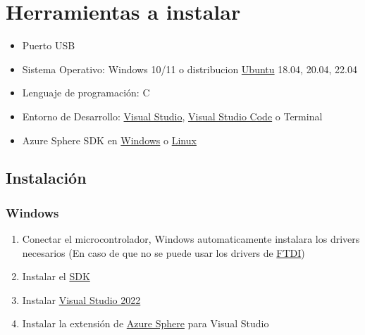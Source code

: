 \section{Herramientas a instalar}

\begin{itemize}
	\item 
	Puerto USB
	\item
	Sistema Operativo: Windows 10/11 o 
	distribucion \href{https://ubuntu.com/}{Ubuntu} 18.04, 20.04, 22.04
	\item 
	Lenguaje de programación: C
	\item 
	Entorno de Desarrollo: \href{https://visualstudio.microsoft.com/es/}{Visual Studio}, 
	\href{https://code.visualstudio.com/}{Visual Studio Code} o Terminal
	\item
	Azure Sphere SDK en \href{https://learn.microsoft.com/en-us/azure-sphere/install/install-sdk}{Windows} o \href{https://learn.microsoft.com/en-us/azure-sphere/install/install-sdk-linux}{Linux}
\end{itemize}

\subsection{Instalación}
\subsubsection{Windows}
\begin{enumerate}
	\item 
	Conectar el microcontrolador, Windows automaticamente instalara los drivers necesarios (En caso de que no se puede usar los drivers de \href{https://www.ftdichip.com/Drivers/VCP.htm}{FTDI})
	\item 
	Instalar el \href{https://aka.ms/AzureSphereSDKDownload/Windows}{SDK}
	\item 
	Instalar \href{https://visualstudio.microsoft.com/downloads/}{Visual Studio 2022}
	\item 
	Instalar la extensión de \href{https://marketplace.visualstudio.com/items?itemName=AzureSphereTeam.AzureSphereSDKforVisualStudio2022}{Azure Sphere} para Visual Studio
\end{enumerate}
